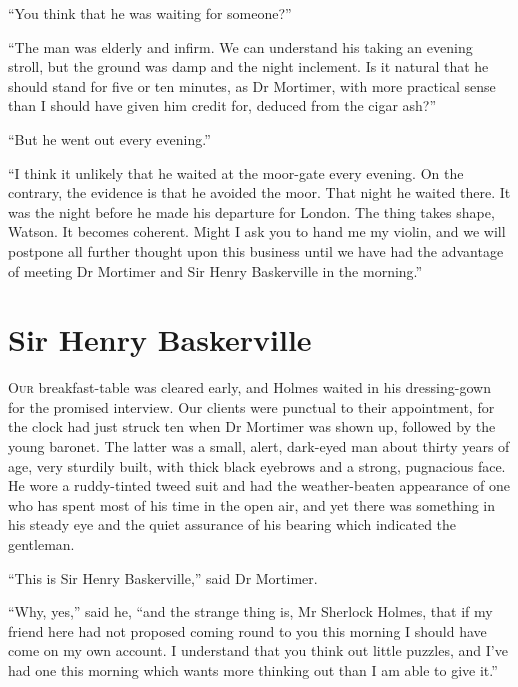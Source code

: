 \documentclass[paper=5.5in:8.5in,BCOR=7mm,twoside,DIV=calc,12pt,usegeometry,openany,chapterprefix,endperiod]{scrbook} %
\begin{document}
\enquote{You think that he was waiting for someone?}

\enquote{The man was elderly and infirm. We can understand his taking an evening stroll, but the ground was damp and the night inclement. Is it natural that he should stand for five or ten minutes, as Dr Mortimer, with more practical sense than I should have given him credit for, deduced from the cigar ash?}

\enquote{But he went out every evening.}

\enquote{I think it unlikely that he waited at the moor-gate every evening. On the contrary, the evidence is that he avoided the moor. That night he waited there. It was the night before he made his departure for London. The thing takes shape, Watson. It becomes coherent. Might I ask you to hand me my violin, and we will postpone all further thought upon this business until we have had the advantage of meeting Dr Mortimer and Sir Henry Baskerville in the morning.}

\chapter{Sir Henry Baskerville}
\lettrine[lines=1]{O}{ur} breakfast-table was cleared early, and Holmes waited in his dressing-gown for the promised interview. Our clients were punctual to their appointment, for the clock had just struck ten when Dr Mortimer was shown up, followed by the young baronet. The latter was a small, alert, dark-eyed man about thirty years of age, very sturdily built, with thick black eyebrows and a strong, pugnacious face. He wore a ruddy-tinted tweed suit and had the weather-beaten appearance of one who has spent most of his time in the open air, and yet there was something in his steady eye and the quiet assurance of his bearing which indicated the gentleman.

\enquote{This is Sir Henry Baskerville,} said Dr Mortimer.


\enquote{Why, yes,} said he, \enquote{and the strange thing is, Mr Sherlock Holmes, that if my friend here had not proposed coming round to you this morning I should have come on my own account. I understand that you think out little puzzles, and I've had one this morning which wants more thinking out than I am able to give it.}
\end{document}
